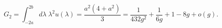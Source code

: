 \begin{equation}\label{planar1sym}
    G_2=\int_{-2a}^{2b} d\lambda \;\lambda^2
    u(\lambda)=\frac{a^2(4+a^2)}{3}=\frac{1}{432g^2}+\frac{1}{6g}+1-8g+o(g).
\end{equation}

